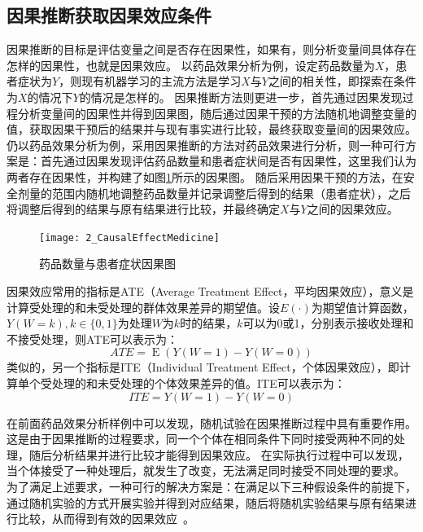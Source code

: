 \documentclass[algorithmlist, AutoFakeBold, AutoFakeSlant, figurelist, tablelist, nomlist, engineering]{seuthesix}
\begin{document}
\subsection{因果推断获取因果效应条件}
因果推断的目标是评估变量之间是否存在因果性，如果有，则分析变量间具体存在怎样的因果性，也就是因果效应。
以药品效果分析为例，设定药品数量为$X$，患者症状为$Y$，则现有机器学习的主流方法是学习$X$与$Y$之间的相关性，即探索在条件为$X$的情况下$Y$的情况是怎样的。
因果推断方法则更进一步，首先通过因果发现过程分析变量间的因果性并得到因果图，随后通过因果干预的方法随机地调整变量的值，获取因果干预后的结果并与现有事实进行比较，最终获取变量间的因果效应。
仍以药品效果分析为例，采用因果推断的方法对药品效果进行分析，则一种可行方案是：首先通过因果发现评估药品数量和患者症状间是否有因果性，这里我们认为两者存在因果性，并构建了如图\ref{2_CausalEffectMedicine}所示的因果图。
随后采用因果干预的方法，在安全剂量的范围内随机地调整药品数量并记录调整后得到的结果（患者症状），之后将调整后得到的结果与原有结果进行比较，并最终确定$X$与$Y$之间的因果效应。
\begin{figure}
  \centering
  \texttt{[image: 2\_CausalEffectMedicine]}
  \caption{药品数量与患者症状因果图}
  \label{2_CausalEffectMedicine}
\end{figure}

因果效应常用的指标是ATE（Average Treatment Effect，平均因果效应），意义是计算受处理的和未受处理的群体效果差异的期望值。设$E(\cdot)$为期望值计算函数，$Y(W=k), k \in \{0, 1\}$为处理$W$为$k$时的结果，$k$可以为0或1，分别表示接收处理和不接受处理，则ATE可以表示为：
\begin{equation}
  ATE=\operatorname{E}\left(Y(W=1) - Y(W=0)\right)
  \label{equation_ATE}
\end{equation}
类似的，另一个指标是ITE（Individual Treatment Effect，个体因果效应），即计算单个受处理的和未受处理的个体效果差异的值。ITE可以表示为：
\begin{equation}
  ITE=Y(W=1) - Y(W=0)
  \label{equation_ITE}
\end{equation}

在前面药品效果分析样例中可以发现，随机试验在因果推断过程中具有重要作用。
这是由于因果推断的过程要求，同一个个体在相同条件下同时接受两种不同的处理，随后分析结果并进行比较才能得到因果效应。
在实际执行过程中可以发现，当个体接受了一种处理后，就发生了改变，无法满足同时接受不同处理的要求。
为了满足上述要求，一种可行的解决方案是：在满足以下三种假设条件的前提下，通过随机实验的方式开展实验并得到对应结果，随后将随机实验结果与原有结果进行比较，从而得到有效的因果效应~\cite{yao2021survey}。
\end{document}
